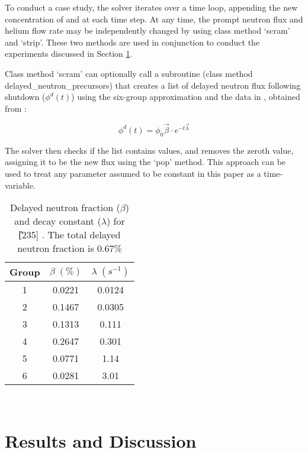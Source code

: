 To conduct a case study, the solver iterates over a time loop, appending the new concentration of \I and \Xe at each time step.  At any time, the prompt neutron flux and helium flow rate may be independently changed by using class method `scram' and `strip'. These two methods are used in conjunction to conduct the experiments discussed in Section \ref{sec-res}.

Class method `scram' can optionally call a subroutine (class method delayed\_neutron\_precursors) that creates a list of delayed neutron flux following shutdown ($\phi^{d}(t)$) using the six-group approximation and the data in , obtained from \cite{Kerlin}:

\begin{equation}\label{eq:dn_flux}
    \phi^{d}(t) = \phi_{0} \vec{\beta} \cdot e^{-t\vec{\lambda}}
\end{equation}

The solver then checks if the list contains values, and removes the zeroth value, assigning it to be the new flux using the `pop' method. This approach can be used to treat any parameter assumed to be constant in this paper as a time-variable.

\begin{table}[ht!]
    \caption[Delayed neutron data]{Delayed neutron fraction ($\beta$) and decay constant ($\lambda$) for \U[235] \cite{Kerlin}. The total delayed neutron fraction is 0.67\%}
    \centering\begin{tabular}{c|cc}
    Group  & $\beta \;(\%)$   & $\lambda \; (s^{-1})$ \\ \hline
        1  & 0.0221           & 0.0124 \\ 
        2  & 0.1467           & 0.0305 \\
        3  & 0.1313           & 0.111  \\ 
        4  & 0.2647           & 0.301  \\ 
        5  & 0.0771           & 1.14   \\ 
        6  & 0.0281           & 3.01   \\               
    \end{tabular}\\
    \label{tab:precursors}
\end{table}


\section{Results and Discussion} \label{sec-res}

